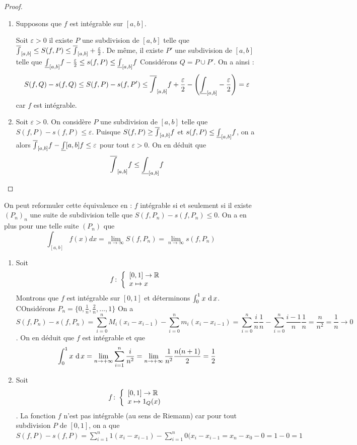 \begin{proof}
    \begin{enumerate}
        \item [$\alors :$] Supposons que $f$ est intégrable sur $[a,b]$.

        Soit $\varepsilon > 0$ il existe $P$ une subdivision de $[a,b]$ telle que $\overline{\int}_{[a,b]}\le S(f,P)\le \overline{\int}_{[a,b]}+\frac{\varepsilon}{2}$. De même, il existe $P'$ une subdivision de $[a,b]$ telle que $\underline{\int}_{[a,b]} f -\frac{\varepsilon}{2}\le s(f,P)\le \underline{\int}_{[a,b]}f$ Considérons $Q = P\cup P'$. On a ainsi :
        \begin{align*}
            S(f,Q) - s(f,Q) \le S(f,P) - s(f,P')\le \overline{\int}_{[a,b]}f + \frac{\varepsilon}{2} - \left(\underline{\int}_{[a,b]}-\frac{\varepsilon}{2}\right) = \varepsilon
        \end{align*} car $f$ est intégrable.
        \item [$\si :$]
        Soit $\varepsilon>0$. On considère $P$ une subdivision de $[a,b]$ telle que $S(f,P)-s(f,P)\le \varepsilon$. Puisque $S(f,P)\ge \overline{\int}_{[a,b]}f$ et $s(f,P)\le \underline{\int}_{[a,b]}f$, on a alors $\overline{\int}_{[a,b]}f - \underline{\int}{[a,b]}f \le \varepsilon$ pour tout $\varepsilon > 0$.
        On en déduit que $$\overline{\int}_{[a,b]} f \le \underline{\int}_{[a,b]}f$$
    \end{enumerate}
\end{proof}
\begin{remarque}
 On peut reformuler cette équivalence en :
 $f$ intégrable si et seulement si il existe $(P_n)_n$ une suite de subdivision telle que $S(f,P_n)-s(f,P_n)\le 0$. On a en plus pour une telle suite $(P_n)$ que $$\int_{[a,b]}f(x)dx = \lim_{n\to \infty} S(f,P_n) = \lim_{n\to \infty} s(f,P_n)$$
\end{remarque}
\begin{exemple}
\begin{enumerate}
    \item Soit $$f\colon \left\{\begin{array}{l}[0,1]\to \mathbb{R} \\x\mapsto x\end{array}\right.$$
    Montrons que $f$ est intégrable sur $[0,1]$ et déterminons $\int_0^1 x\,\operatorname{d} x$.
    COnsidérons $P_n = \{0,\frac{1}{n},\frac{2}{n},...,1\}$ On a 
    $$ S(f,P_n) - s(f,P_n) =\sum_{i=0}^n M_i(x_i-x_{i-1}) - \sum_{i=0}^n m_i(x_i-x_{i-1})  = \sum_{i = 0}^n \frac{i}{n}\frac{1}{n} - \sum_{i = 0}^n \frac{i-1}{n} \frac{1}{n} = \frac{n}{n^2} = \frac{1}{n} \to 0$$. On en déduit que $f$ est intégrable et que $$\int_0^1x\,\operatorname{d} x = \lim_{n\to+\infty} \sum_{i = 1}^n \frac{i}{n^2} =\lim_{n\to+\infty} \frac{1}{n^2}\frac{n(n+1)}{2} = \frac{1}{2}$$
    \item Soit $$f\colon \left\{\begin{array}{l}[0,1]\to \mathbb{R} \\x\mapsto 1_Q(x)\end{array}\right.$$.
    La fonction $f$ n'est pas intégrable (au sens de Riemann) car pour tout subdivision $P$ de $[0,1]$, on a que $S(f,P) - s(f,P) = \sum_{i = 1}^n1(x_i-x_{i-1}) -\sum_{i=1}^n0(x_i-x_{i-1}  = x_n - x_0  - 0= 1 - 0 = 1$ 
    \end{enumerate}
\end{exemple}
